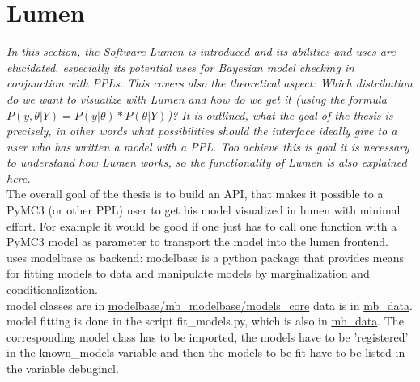 \documentclass{article}
\begin{document}





\section{Lumen}

\textit{In this section, the Software Lumen is introduced and its abilities and uses are elucidated, especially its potential uses for Bayesian model checking in conjunction with PPLs. This covers also the theoretical aspect: Which distribution do we want to visualize with Lumen and how do we get it (using the formula $P(y,\theta|Y) = P(y|\theta) * P(\theta|Y)$)? It is outlined, what the goal of the thesis is precisely, in other words what possibilities should the interface ideally give to a user who has written a model with a PPL. Too achieve this is goal it is necessary to understand how Lumen works, so the functionality of Lumen is also explained here.} 
\\
The overall goal of the thesis is to build an API, that makes it possible to a PyMC3 (or other PPL) user to get his model visualized in lumen with minimal effort. For example it would be good if one just has to call one function with a PyMC3 model as parameter to transport the model into the lumen frontend.
\\
uses modelbase as backend: modelbase is a python package that provides means for fitting models to data and manipulate models by marginalization and conditionalization.
\\
model classes are in \url{modelbase/mb_modelbase/models_core}
data is in \url{mb_data}. model fitting is done in the script fit\_models.py, which is also in \url{mb_data}. The corresponding model class has to be imported, the models have to be 'registered' in the known\_models variable and then the models to be fit have to be listed in the variable debugincl.
\end{document}
